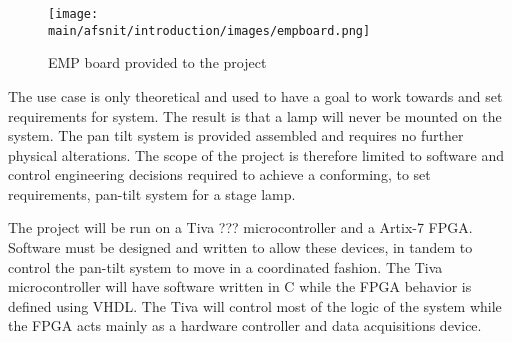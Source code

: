 \documentclass[../../main]{subfiles}
\begin{document}
\begin{figure}[H]
\texttt{[image: \\main/afsnit/introduction/images/empboard.png]}
\caption{EMP board provided to the project}
\label{fig:empboard}
\end{figure}

The use case is only theoretical and used to have a goal to work towards and set requirements for system. The result is that a lamp will never be mounted on the system.
The pan tilt system is provided assembled and requires no further physical alterations. The scope of the project is therefore limited to software and control engineering decisions required to achieve a conforming, to set requirements, pan-tilt system for a stage lamp.

The project will be run on a Tiva ??? microcontroller and a Artix-7 FPGA. Software must be designed and written to allow these devices, in tandem to control the pan-tilt system to move in a coordinated fashion. 
The Tiva microcontroller will have software written in C while the FPGA behavior is defined using VHDL. The Tiva will control most of the logic of the system while the FPGA acts mainly as a hardware controller and data acquisitions device. 
\end{document}
